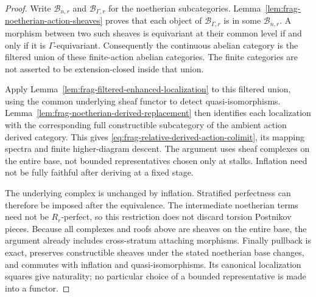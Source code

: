 \documentclass[11pt]{article}
\theoremstyle{definition}
\theoremstyle{remark}
\begin{document}
\begin{proof}
Write $\mathcal B_{n,r}$ and $\mathcal B_{\Gamma,r}$ for the noetherian
subcategories.  Lemma~\ref{lem:frag-noetherian-action-sheaves} proves
that each object of $\mathcal B_{\Gamma,r}$ is in some
$\mathcal B_{n,r}$.  A morphism between two such sheaves is equivariant
at their common level if and only if it is $\Gamma$-equivariant.
Consequently the continuous abelian category is the filtered union of
these finite-action abelian categories.  The finite categories are not
asserted to be extension-closed inside that union.

Apply Lemma~\ref{lem:frag-filtered-enhanced-localization} to this
filtered union, using the common underlying sheaf functor to detect
quasi-isomorphisms.  Lemma~\ref{lem:frag-noetherian-derived-replacement}
then identifies each localization with the corresponding full
constructible subcategory of the ambient action derived category.
This gives \eqref{eq:frag-relative-derived-action-colimit}, its mapping
spectra and finite higher-diagram descent.  The argument uses sheaf
complexes on the entire base, not bounded representatives chosen only
at stalks.  Inflation need not be fully faithful after deriving at a
fixed stage.

The underlying complex is unchanged by inflation.  Stratified
perfectness can therefore be imposed after the equivalence.  The
intermediate noetherian terms need not be $R_r$-perfect, so this
restriction does not discard torsion Postnikov pieces.  Because all
complexes and roofs above are sheaves on the entire base, the argument
already includes cross-stratum attaching morphisms.  Finally pullback
is exact, preserves constructible sheaves under the stated noetherian
base changes, and commutes with inflation and quasi-isomorphisms.
Its canonical localization squares give naturality; no particular
choice of a bounded representative is made into a functor.
\end{proof}
\end{document}
